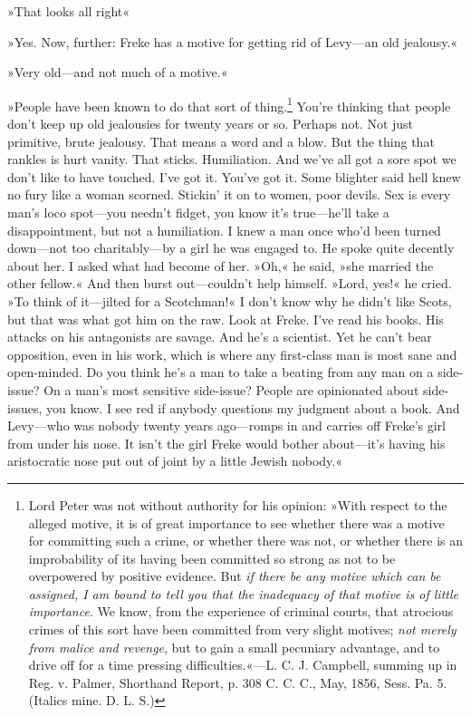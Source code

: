 »That looks all right\longdash«

»Yes. Now, further: Freke has a motive for getting rid of Levy—an old jealousy.«

»Very old—and not much of a motive.«

»People have been known to do that sort of thing.\footnote{Lord Peter was not without authority for his opinion: »With respect to the alleged motive, it is of great importance to see whether there was a motive for committing such a crime, or whether there was not, or whether there is an improbability of its having been committed so strong as not to be overpowered by positive evidence. But \textit{if there be any motive which can be assigned, I am bound to tell you that the inadequacy of that motive is of little importance}. We know, from the experience of criminal courts, that atrocious crimes of this sort have been committed from very slight motives; \textit{not merely from malice and revenge}, but to gain a small pecuniary advantage, and to drive off for a time pressing difficulties.«—L. C. J. Campbell, summing up in Reg. v. Palmer, Shorthand Report, p. 308 C. C. C., May, 1856, Sess. Pa. 5. (Italics mine. D. L. S.)}	You're thinking that people don't keep up old jealousies for twenty years or so. Perhaps not. Not just primitive, brute jealousy. That means a word and a blow. But the thing that rankles is hurt vanity. That sticks. Humiliation. And we've all got a sore spot we don't like to have touched. I've got it. You've got it. Some blighter said hell knew no fury like a woman scorned. Stickin' it on to women, poor devils. Sex is every man's loco spot—you needn't fidget, you know it's true—he'll take a disappointment, but not a humiliation. I knew a man once who'd been turned down—not too charitably—by a girl he was engaged to. He spoke quite decently about her. I asked what had become of her. »Oh,« he said, »she married the other fellow.« And then burst out—couldn't help himself. »Lord, yes!« he cried. »To think of it—jilted for a Scotchman!« I don't know why he didn't like Scots, but that was what got him on the raw. Look at Freke. I've read his books. His attacks on his antagonists are savage. And he's a scientist. Yet he can't bear opposition, even in his work, which is where any first-class man is most sane and open-minded. Do you think he's a man to take a beating from any man on a side-issue? On a man's most sensitive side-issue? People are opinionated about side-issues, you know. I see red if anybody questions my judgment about a book. And Levy—who was nobody twenty years ago—romps in and carries off Freke's girl from under his nose. It isn't the girl Freke would bother about—it's having his aristocratic nose put out of joint by a little Jewish nobody.«

